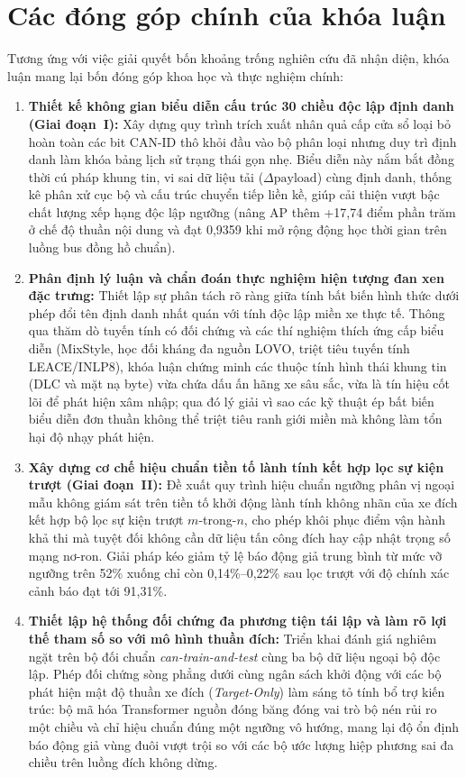 \documentclass[12pt, a4paper, reqno, oneside]{book}
\newcommand\sect[1]{%
  \Needspace{5\baselineskip}%
  \phantomsection%
  \addcontentsline{toc}{section}{#1}%
  \section*{#1}%
}
\begin{document}
\sect{Các đóng góp chính của khóa luận}
Tương ứng với việc giải quyết bốn khoảng trống nghiên cứu đã nhận diện, khóa luận mang lại bốn đóng góp khoa học và thực nghiệm chính:
\begin{enumerate}
  \item \textbf{Thiết kế không gian biểu diễn cấu trúc 30 chiều độc lập định danh (Giai đoạn~I):} Xây dựng quy trình trích xuất nhân quả cấp cửa sổ loại bỏ hoàn toàn các bit CAN-ID thô khỏi đầu vào bộ phân loại nhưng duy trì định danh làm khóa bảng lịch sử trạng thái gọn nhẹ. Biểu diễn này nắm bắt đồng thời cú pháp khung tin, vi sai dữ liệu tải ($\Delta\text{payload}$) cùng định danh, thống kê phân xử cục bộ và cấu trúc chuyển tiếp liền kề, giúp cải thiện vượt bậc chất lượng xếp hạng độc lập ngưỡng (nâng AP thêm +17,74 điểm phần trăm ở chế độ thuần nội dung và đạt 0,9359 khi mở rộng động học thời gian trên luồng bus đồng hồ chuẩn).
  \item \textbf{Phân định lý luận và chẩn đoán thực nghiệm hiện tượng đan xen đặc trưng:} Thiết lập sự phân tách rõ ràng giữa tính bất biến hình thức dưới phép đổi tên định danh nhất quán với tính độc lập miền xe thực tế. Thông qua thăm dò tuyến tính có đối chứng và các thí nghiệm thích ứng cấp biểu diễn (MixStyle, học đối kháng đa nguồn LOVO, triệt tiêu tuyến tính LEACE/INLP8), khóa luận chứng minh các thuộc tính hình thái khung tin (DLC và mặt nạ byte) vừa chứa dấu ấn hãng xe sâu sắc, vừa là tín hiệu cốt lõi để phát hiện xâm nhập; qua đó lý giải vì sao các kỹ thuật ép bất biến biểu diễn đơn thuần không thể triệt tiêu ranh giới miền mà không làm tổn hại độ nhạy phát hiện.
  \item \textbf{Xây dựng cơ chế hiệu chuẩn tiền tố lành tính kết hợp lọc sự kiện trượt (Giai đoạn~II):} Đề xuất quy trình hiệu chuẩn ngưỡng phân vị ngoại mẫu không giám sát trên tiền tố khởi động lành tính không nhãn của xe đích kết hợp bộ lọc sự kiện trượt $m$-trong-$n$, cho phép khôi phục điểm vận hành khả thi mà tuyệt đối không cần dữ liệu tấn công đích hay cập nhật trọng số mạng nơ-ron. Giải pháp kéo giảm tỷ lệ báo động giả trung bình từ mức vỡ ngưỡng trên 52\% xuống chỉ còn 0,14\%--0,22\% sau lọc trượt với độ chính xác cảnh báo đạt tới 91,31\%.
  \item \textbf{Thiết lập hệ thống đối chứng đa phương tiện tái lập và làm rõ lợi thế tham số so với mô hình thuần đích:} Triển khai đánh giá nghiêm ngặt trên bộ đối chuẩn \textit{can-train-and-test} cùng ba bộ dữ liệu ngoại bộ độc lập. Phép đối chứng sòng phẳng dưới cùng ngân sách khởi động với các bộ phát hiện mật độ thuần xe đích (\textit{Target-Only}) làm sáng tỏ tính bổ trợ kiến trúc: bộ mã hóa Transformer nguồn đóng băng đóng vai trò bộ nén rủi ro một chiều và chỉ hiệu chuẩn đúng một ngưỡng vô hướng, mang lại độ ổn định báo động giả vùng đuôi vượt trội so với các bộ ước lượng hiệp phương sai đa chiều trên luồng đích không dừng.
\end{enumerate}
\end{document}
